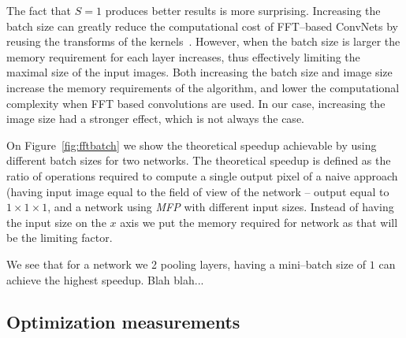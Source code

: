 \documentclass[conference]{./IEEEtran/IEEEtran}
\begin{document}
  The fact that $S=1$ produces better results is more surprising.
  Increasing the batch size can greatly reduce the computational cost
  of FFT--based ConvNets by reusing the transforms of the
  kernels~\cite{mathieu-iclr-14,vasilache2014fast}.  However, when the
  batch size is larger the memory requirement for each layer
  increases, thus effectively limiting the maximal size of the input
  images.  Both increasing the batch size and image size
  increase the memory requirements of the algorithm, and lower the
  computational complexity when FFT based convolutions are used.  In
  our case, increasing the image size had a stronger effect, which is
  not always the case.

  On Figure~\ref{fig:fftbatch} we show the theoretical speedup
  achievable by using different batch sizes for two networks.
  The theoretical speedup is defined as the ratio of operations
  required to compute a single output pixel of a naive approach
  (having input image equal to the field of view of the network --
  output equal to $1 \times 1 \times 1$, and a network using
  \emph{MFP} with different input sizes.  Instead of having the input
  size on the $x$ axis we put the memory required for network as that
  will be the limiting factor.

  We see that for a network we 2 pooling layers, having a mini--batch
  size of $1$ can achieve the highest speedup.  Blah blah...


\subsection{Optimization measurements}


\end{document}
